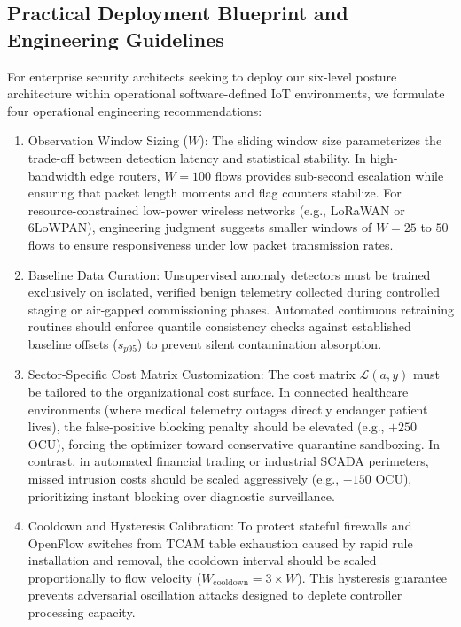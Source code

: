 \documentclass[journal,10pt,onecolumn]{IEEEtran}
\begin{document}
\subsection{Practical Deployment Blueprint and Engineering Guidelines}
For enterprise security architects seeking to deploy our six-level posture architecture within operational software-defined IoT environments, we formulate four operational engineering recommendations:
\begin{enumerate}
  \item Observation Window Sizing ($W$): The sliding window size parameterizes the trade-off between detection latency and statistical stability. In high-bandwidth edge routers, $W = 100$ flows provides sub-second escalation while ensuring that packet length moments and flag counters stabilize. For resource-constrained low-power wireless networks (e.g., LoRaWAN or 6LoWPAN), engineering judgment suggests smaller windows of $W = 25$ to $50$ flows to ensure responsiveness under low packet transmission rates.
  \item Baseline Data Curation: Unsupervised anomaly detectors must be trained exclusively on isolated, verified benign telemetry collected during controlled staging or air-gapped commissioning phases. Automated continuous retraining routines should enforce quantile consistency checks against established baseline offsets ($s_{p95}$) to prevent silent contamination absorption.
  \item Sector-Specific Cost Matrix Customization: The cost matrix $\mathcal{L}(a, y)$ must be tailored to the organizational cost surface. In connected healthcare environments (where medical telemetry outages directly endanger patient lives), the false-positive blocking penalty should be elevated (e.g., $+250$ OCU), forcing the optimizer toward conservative quarantine sandboxing. In contrast, in automated financial trading or industrial SCADA perimeters, missed intrusion costs should be scaled aggressively (e.g., $-150$ OCU), prioritizing instant blocking over diagnostic surveillance.
  \item Cooldown and Hysteresis Calibration: To protect stateful firewalls and OpenFlow switches from TCAM table exhaustion caused by rapid rule installation and removal, the cooldown interval should be scaled proportionally to flow velocity ($W_{\text{cooldown}} = 3 \times W$). This hysteresis guarantee prevents adversarial oscillation attacks designed to deplete controller processing capacity.
\end{enumerate}
\end{document}
